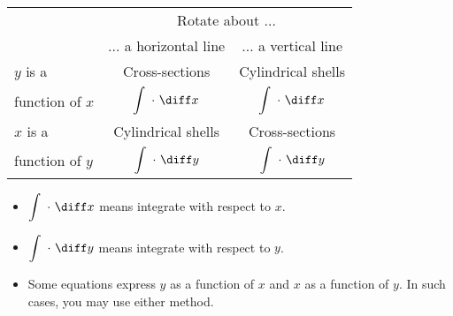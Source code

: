 \begin{frame}
\begin{center}
\begin{tabular}{|l||c|c|}
\hline
&  \multicolumn{2}{|c|}{Rotate about $\ldots$}\\
\cline{2-3}
& $\ldots$ a horizontal line & $\ldots$ a vertical line \\
\hline
\hline
$y$ is a & Cross-sections & Cylindrical shells \\
function of $x$ & $\displaystyle \int \ \cdot \ \diff x$ & $\displaystyle \int \ \cdot \ \diff x$ \\
\hline
$x$ is a & Cylindrical shells & Cross-sections \\
function of $y$ & $\displaystyle \int \ \cdot \ \diff y$ & $\displaystyle \int \ \cdot \ \diff y$ \\
\hline
\end{tabular}
\end{center}

\begin{itemize}
\item  $\displaystyle \int \ \cdot \ \diff x$ means integrate with respect to $x$.
\item  $\displaystyle \int \ \cdot \ \diff y$ means integrate with respect to $y$.
\item  Some equations express $y$ as a function of $x$ and $x$ as a function of $y$.  In such cases, you may use either method.
\end{itemize}
\end{frame}
